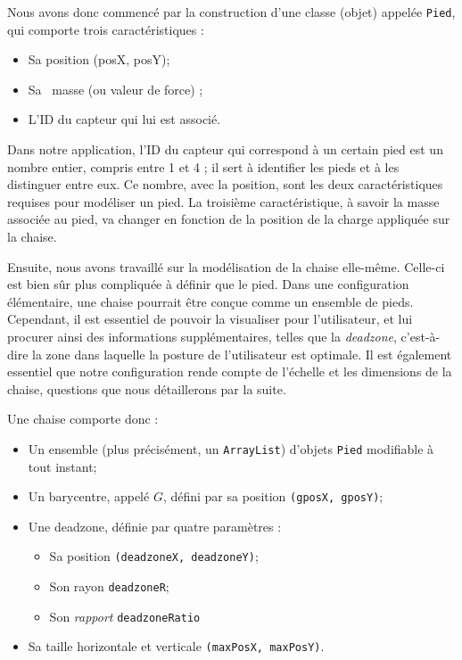 \documentclass{polytech/polytech}
\begin{document}
Nous avons donc commencé par la construction d'une classe (objet) appelée \texttt{Pied}, qui comporte trois caractéristiques :
\begin{itemize}
\item Sa position (posX, posY);
\item Sa \guillemotleft\ masse \guillemotright (ou valeur de force) ;
\item L’ID du capteur qui lui est associé.
\end{itemize}

Dans notre application, l'ID du capteur qui correspond à un certain pied est un nombre entier, compris entre 1 et 4 ; il sert à identifier les pieds et à les distinguer entre eux. Ce nombre, avec la position, sont les deux caractéristiques requises pour modéliser un pied. La troisième caractéristique, à savoir la masse associée au pied, va changer en fonction de la position de la charge appliquée sur la chaise.

Ensuite, nous avons travaillé sur la modélisation de la chaise elle-même. 
Celle-ci est bien sûr plus compliquée à définir que le pied. 
Dans une configuration élémentaire, une chaise pourrait être conçue comme un ensemble de pieds.
Cependant, il est essentiel de pouvoir la visualiser pour l'utilisateur, et lui procurer ainsi des informations supplémentaires, telles que la \textit{deadzone}, c'est-à-dire la zone dans laquelle la posture de l'utilisateur est optimale.
Il est également essentiel que notre configuration rende compte de l'échelle et les dimensions de la chaise, questions que nous détaillerons par la suite.

Une chaise comporte donc :
\begin{itemize}
\item Un ensemble (plus précisément, un \texttt{ArrayList}) d'objets \texttt{Pied} modifiable à tout instant;
\item Un barycentre, appelé $G$, défini par sa position \texttt{(gposX, gposY)};
\item Une deadzone, définie par quatre paramètres :
\begin{itemize}
\item Sa position \texttt{(deadzoneX, deadzoneY)};
\item Son rayon \texttt{deadzoneR};
\item Son \textit{rapport} \texttt{deadzoneRatio}
\end{itemize}
\item Sa taille horizontale et verticale \texttt{(maxPosX, maxPosY)}.
\end{itemize}
\end{document}
